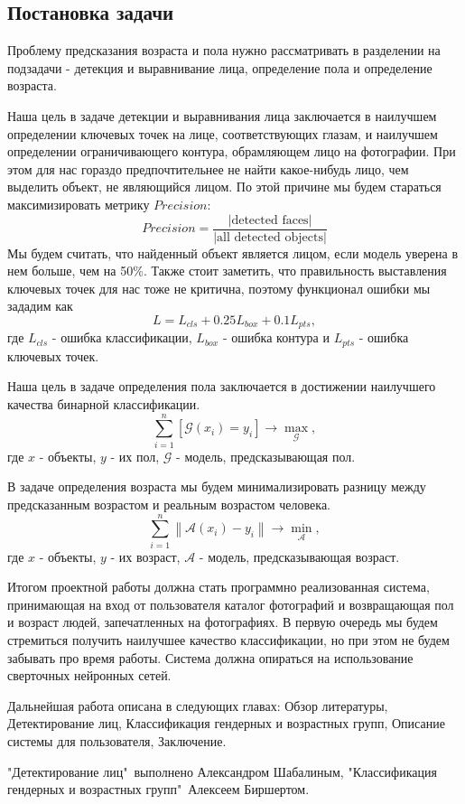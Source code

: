 \subsection{Постановка задачи}\label{subsec:постановка-задачи}
\par Проблему предсказания возраста и пола нужно рассматривать в разделении на подзадачи - детекция и выравнивание лица,
определение пола и определение возраста.
\par Наша цель в задаче детекции и выравнивания лица заключается в наилучшем определении ключевых точек на лице,
соответствующих глазам, и наилучшем определении ограничивающего контура, обрамляющем лицо на фотографии.
При этом для нас гораздо предпочтительнее не найти какое-нибудь лицо, чем выделить объект, не являющийся лицом.
По этой причине мы будем стараться максимизировать метрику $Precision$:
\[Precision = \frac{|\text{detected faces}|}{|\text{all detected objects}|}\]
Мы будем считать, что найденный объект является лицом, если модель уверена в нем больше, чем на 50\%.
Также стоит заметить, что правильность выставления ключевых точек для нас тоже не критична,
поэтому функционал ошибки мы зададим как \[L = L_{cls} + 0.25 L_{box} + 0.1 L_{pts},\]
где $L_{cls}$ - ошибка классификации, $L_{box}$ - ошибка контура и $L_{pts}$ - ошибка ключевых точек.
\par Наша цель в задаче определения пола заключается в достижении наилучшего качества бинарной классификации.
\[\sum\limits_{i = 1}^{n} \left[ \mathcal{G}(x_i) = y_i \right] \to \max\limits_{\mathcal{G}}, \]
где $x$ - объекты, $y$ - их пол, $\mathcal{G}$ - модель, предсказывающая пол.
\par В задаче определения возраста мы будем минимализировать разницу между предсказанным возрастом и реальным возрастом человека.
\[\sum\limits_{i=1}^{n} \left\| \mathcal{A}(x_i) - y_i \right\| \to \min\limits_{\mathcal{A}}, \]
где $x$ - объекты, $y$ - их возраст, $\mathcal{A}$ - модель, предсказывающая возраст.
\par Итогом проектной работы должна стать программно реализованная система, принимающая на вход от пользователя каталог фотографий
и возвращающая пол и возраст людей, запечатленных на фотографиях.
В первую очередь мы будем стремиться получить наилучшее качество классификации, но при этом не будем забывать про время работы.
Система должна опираться на использование сверточных нейронных сетей.
\par Дальнейшая работа описана в следующих главах: Обзор литературы, Детектирование лиц,
Классификация гендерных и возрастных групп, Описание системы для пользователя, Заключение.
\par "Детектирование лиц"\, выполнено Александром Шабалиным, "Классификация гендерных и возрастных групп"\, Алексеем Биршертом.